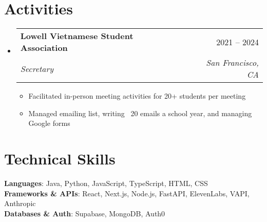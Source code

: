 \documentclass[letterpaper,11pt]{article}
\makeatletter
\newcommand{\resumeItem}[1]{
  \item\small{
    {#1 \vspace{-2pt}}
  }
}
\newcommand{\resumeSubheading}[4]{
  \vspace{-2pt}\item
    \begin{tabular*}{0.97\textwidth}[t]{l@{\extracolsep{\fill}}r}
      \textbf{#1} & #2 \\
      \textit{\small#3} & \textit{\small #4} \\
    \end{tabular*}\vspace{-7pt}
}
\newcommand{\resumeSubHeadingListStart}{\begin{itemize}[leftmargin=0.15in, label={}]}
\newcommand{\resumeSubHeadingListEnd}{\end{itemize}}
\newcommand{\resumeItemListStart}{\begin{itemize}}
\newcommand{\resumeItemListEnd}{\end{itemize}\vspace{-5pt}}
\makeatother
\begin{document}
\section{Activities}
  \resumeSubHeadingListStart
    \resumeSubheading
      {Lowell Vietnamese Student Association}{2021 -- 2024}
      {Secretary}{San Francisco, CA}
      \resumeItemListStart
        \resumeItem{Facilitated in-person meeting activities for 20+ students per meeting}
        \resumeItem{Managed emailing list, writing ~20 emails a school year, and managing Google forms}
      \resumeItemListEnd
  \resumeSubHeadingListEnd


\section{Technical Skills}
 \begin{itemize}[leftmargin=0.15in, label={}]
    \small{\item{
     \textbf{Languages}{: Java, Python, JavaScript, TypeScript, HTML, CSS} \\
     \textbf{Frameworks \& APIs}{: React, Next.js, Node.js, FastAPI, ElevenLabs, VAPI, Anthropic} \\
     \textbf{Databases \& Auth}{: Supabase, MongoDB, Auth0}
    }}
 \end{itemize}


\end{document}
